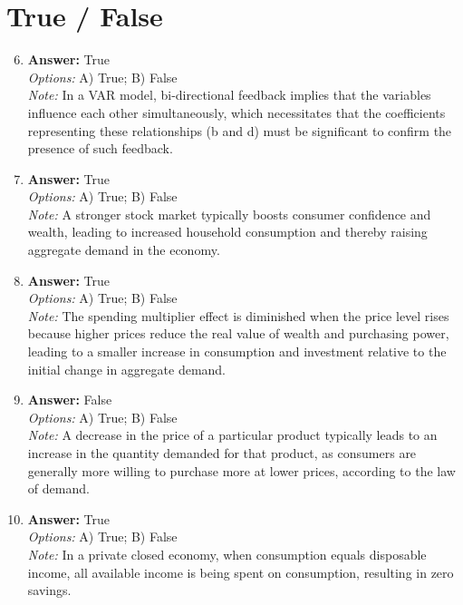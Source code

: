 \documentclass[12pt]{article}
\begin{document}
\section*{True / False}
\begin{enumerate}[label=\arabic*.]
\setcounter{enumi}{5}
\item \textbf{Answer:} True
\\ \textit{Options:} A) True; B) False
\\ \textit{Note:} In a VAR model, bi-directional feedback implies that the variables influence each other simultaneously, which necessitates that the coefficients representing these relationships (b and d) must be significant to confirm the presence of such feedback.
\item \textbf{Answer:} True
\\ \textit{Options:} A) True; B) False
\\ \textit{Note:} A stronger stock market typically boosts consumer confidence and wealth, leading to increased household consumption and thereby raising aggregate demand in the economy.
\item \textbf{Answer:} True
\\ \textit{Options:} A) True; B) False
\\ \textit{Note:} The spending multiplier effect is diminished when the price level rises because higher prices reduce the real value of wealth and purchasing power, leading to a smaller increase in consumption and investment relative to the initial change in aggregate demand.
\item \textbf{Answer:} False
\\ \textit{Options:} A) True; B) False
\\ \textit{Note:} A decrease in the price of a particular product typically leads to an increase in the quantity demanded for that product, as consumers are generally more willing to purchase more at lower prices, according to the law of demand.
\item \textbf{Answer:} True
\\ \textit{Options:} A) True; B) False
\\ \textit{Note:} In a private closed economy, when consumption equals disposable income, all available income is being spent on consumption, resulting in zero savings.
\end{enumerate}
\end{document}
